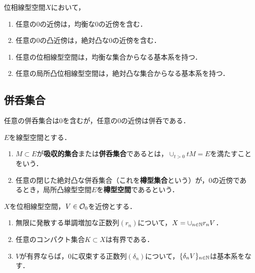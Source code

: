 \documentclass[uplatex,dvipdfmx]{jsreport}
\begin{document}
\begin{theorem}
    位相線型空間$X$において，
    \begin{enumerate}
        \item 任意の$0$の近傍は，均衡な$0$の近傍を含む．
        \item 任意の$0$の凸近傍は，絶対凸な$0$の近傍を含む．
    \end{enumerate}
\end{theorem}

\begin{corollary}\mbox{}\label{cor-locally-convex-space}
    \begin{enumerate}
        \item 任意の位相線型空間は，均衡な集合からなる基本系を持つ．
        \item 任意の局所凸位相線型空間は，絶対凸な集合からなる基本系を持つ．
    \end{enumerate}
\end{corollary}

\subsection{併呑集合}

\begin{tcolorbox}[colframe=ForestGreen, colback=ForestGreen!10!white,breakable,colbacktitle=ForestGreen!40!white,coltitle=black,fonttitle=\bfseries\sffamily,
title=]
    任意の併呑集合は$0$を含むが，任意の$0$の近傍は併呑である．
\end{tcolorbox}

\begin{definition}\label{def-barrel}
    $E$を線型空間とする．
    \begin{enumerate}
        \item $M\subset E$が\textbf{吸収的集合}または\textbf{併呑集合}であるとは，$\cup_{t>0}tM=E$を満たすことをいう．
        \item 任意の閉じた絶対凸な併呑集合（これを\textbf{樽型集合}という）が，$0$の近傍であるとき，局所凸線型空間$E$を\textbf{樽型空間}であるという．
    \end{enumerate}
\end{definition}

\begin{theorem}[近傍は併呑]\label{thm-neighborhood-is-absorbant}
    $X$を位相線型空間，$V\in\mathcal{O}_0$を近傍とする．
    \begin{enumerate}
        \item 無限に発散する単調増加な正数列$(r_n)$について，$X=\cup_{n\in\mathbb{N}}r_nV$．
        \item 任意のコンパクト集合$K\subset X$は有界である．
        \item $V$が有界ならば，$0$に収束する正数列$(\delta_n)$について，$\{\delta_nV\}_{n\in\mathbb{N}}$は基本系をなす．
    \end{enumerate}
\end{theorem}
\end{document}
